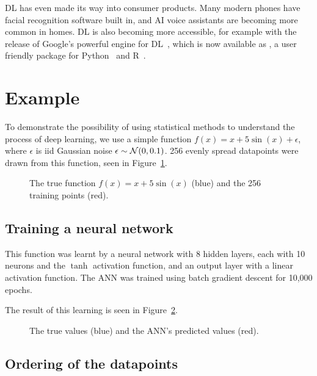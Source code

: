 \ac{DL} has even made its way into consumer products.
Many modern phones have facial recognition software built in, and \ac{AI} voice assistants are becoming more common in homes.
\ac{DL} is also becoming more accessible, for example with the release of Google's powerful  engine for \ac{DL}~\autocite{abadi2016}, which is now available as , a user friendly package for Python~\autocite{chollet2015} and R~\autocite{allaire2018}.

\section{Example}

To demonstrate the possibility of using statistical methods to understand the process of deep learning, we use a simple function \(f(x) = x + 5 \sin(x) + \epsilon\), where \(\epsilon\) is iid Gaussian noise \(\epsilon \sim \mathcal{N}(0, 0.1)\).
256 evenly spread datapoints were drawn from this function, seen in Figure~\ref{fig:sin-x-dataset}.

\begin{figure}[htbp]
	\centering
	
	\caption{The true function \(f(x) = x + 5 \sin(x)\) (blue) and the 256 training points (red).}
	\label{fig:sin-x-dataset}
\end{figure}

\subsection{Training a neural network}

This function was learnt by a neural network with 8 hidden layers, each with 10 neurons and the \(\tanh\) activation function, and an output layer with a linear activation function.
The \acl{ANN} was trained using batch gradient descent for 10,000 epochs.

The result of this learning is seen in Figure~\ref{fig:ann-preds}.

\begin{figure}[htbp]
	\centering
	
	\caption{The true values (blue) and the ANN's predicted values (red).}
	\label{fig:ann-preds}
\end{figure}

\subsection{Ordering of the datapoints}

